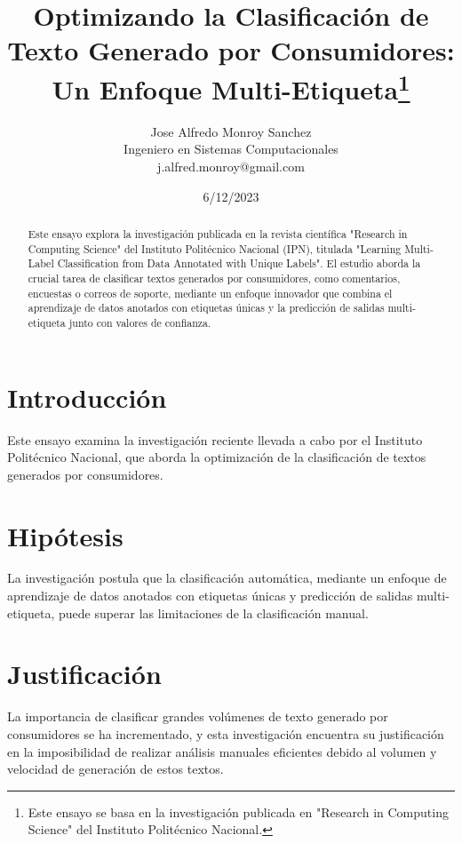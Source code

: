 \documentclass[12pt]{article}
\begin{document}
\title{Optimizando la Clasificación de Texto Generado por Consumidores: Un Enfoque Multi-Etiqueta\thanks{Este ensayo se basa en la investigación publicada en "Research in Computing Science" del Instituto Politécnico Nacional.}}

\author{Jose Alfredo Monroy Sanchez\\
Ingeniero en Sistemas Computacionales\\
j.alfred.monroy@gmail.com}

\date{6/12/2023}

\maketitle

\begin{abstract}
  Este ensayo explora la investigación publicada en la revista científica "Research in Computing Science" del Instituto Politécnico Nacional (IPN), titulada "Learning Multi-Label Classification from Data Annotated with Unique Labels". El estudio aborda la crucial tarea de clasificar textos generados por consumidores, como comentarios, encuestas o correos de soporte, mediante un enfoque innovador que combina el aprendizaje de datos anotados con etiquetas únicas y la predicción de salidas multi-etiqueta junto con valores de confianza.
\end{abstract}

\section{Introducción}
Este ensayo examina la investigación reciente llevada a cabo por el Instituto Politécnico Nacional, que aborda la optimización de la clasificación de textos generados por consumidores.

\section{Hipótesis}
La investigación postula que la clasificación automática, mediante un enfoque de aprendizaje de datos anotados con etiquetas únicas y predicción de salidas multi-etiqueta, puede superar las limitaciones de la clasificación manual.

\section{Justificación}
La importancia de clasificar grandes volúmenes de texto generado por consumidores se ha incrementado, y esta investigación encuentra su justificación en la imposibilidad de realizar análisis manuales eficientes debido al volumen y velocidad de generación de estos textos.
\end{document}
